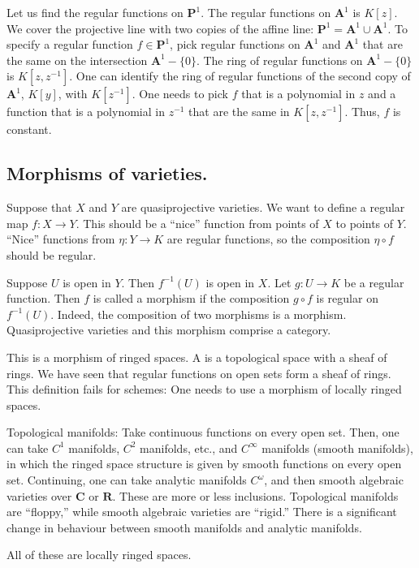 \documentclass [11 pt, oneside] {article}
\begin{document}
\begin{example}[ ]\label{}
Let us find the regular functions on $\mathbf{P}^1$. The regular functions on $\mathbf{A}^1$ is $K[z]$. We cover the projective line with two copies of the affine line: $\mathbf{P}^1 = \mathbf{A}^1\cup \mathbf{A}^1$. To specify a regular function $f\in \mathbf{P}^1$, pick regular functions on $\mathbf{A}^1$ and $\mathbf{A}^1$ that are the same on the intersection $\mathbf{A}^1-\{0\}$. The ring of regular functions on $\mathbf{A}^1-\{0\}$ is $K[z,z^{-1}]$. One can identify the ring of regular functions of the second copy of $\mathbf{A}^1$, $K[y]$, with $K[z^{-1}]$. One needs to pick $f$ that is a polynomial in $z$ and a function that is a polynomial in $z^{-1}$ that are the same in $K[z,z^{-1}]$. Thus, $f$ is constant.
\end{example}

\subsection{Morphisms of varieties.}
Suppose that $X$ and $Y$ are quasiprojective varieties. We want to define a regular map $f:X\longrightarrow Y$. This should be a ``nice'' function from points of $X$ to points of $Y$. ``Nice'' functions from $\eta:Y\longrightarrow K$ are regular functions, so the composition $\eta\circ f$ should be regular.

Suppose $U$ is open in $Y$. Then $f^{-1}(U)$ is open in $X$. Let $g: U\longrightarrow K$ be a regular function. Then $f$ is called a morphism if the composition $g\circ f$ is regular on $f^{-1}(U)$. Indeed, the composition of two morphisms is a morphism. Quasiprojective varieties and this morphism comprise a category.

\begin{warn}
	This is a morphism of ringed spaces. A  is a topological space with a sheaf of rings. We have seen that regular functions on open sets form a sheaf of rings. This definition fails for schemes: One needs to use a morphism of locally ringed spaces.
\end{warn}

\begin{example}\label{}
	 Topological manifolds: Take continuous functions on every open set. Then, one can take $C^1$ manifolds, $C^2$ manifolds, etc., and $C^\infty$ manifolds (smooth manifolds), in which the ringed space structure is given by smooth functions on every open set. Continuing, one can take analytic manifolds $C^\omega$, and then smooth algebraic varieties over $\mathbf{C}$ or $\mathbf{R}$. These are more or less inclusions. Topological manifolds are ``floppy,'' while smooth algebraic varieties are ``rigid.'' There is a significant change in behaviour between smooth manifolds and analytic manifolds.  

	 All of these are locally ringed spaces.
\end{example}
\end{document}
